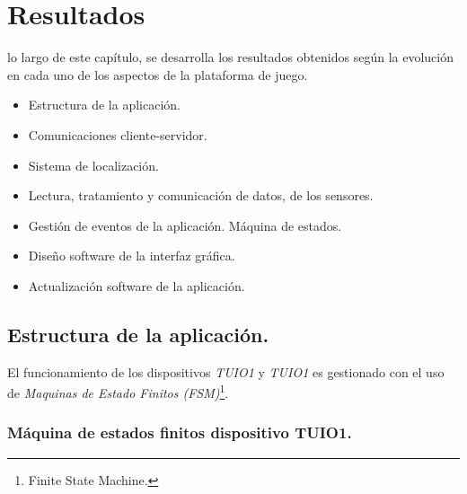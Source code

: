 \chapter{Resultados}
\label{chap:resultados}


 lo largo de este capítulo, se desarrolla los resultados obtenidos según la evolución en cada uno de los aspectos de la plataforma de juego.
\begin{itemize}
\item Estructura de la aplicación.
\item Comunicaciones cliente-servidor.
\item Sistema de localización.
\item Lectura, tratamiento y comunicación de datos, de los sensores.
\item Gestión de eventos de la aplicación. Máquina de estados.
\item Diseño software de la interfaz gráfica.
\item Actualización software de la aplicación.
\end{itemize}


\section{Estructura de la aplicación.}
El funcionamiento de los dispositivos \emph{TUIO1} y \emph{TUIO1} es gestionado con el uso de \emph{Maquinas de Estado Finitos (FSM)}\footnote{Finite State Machine.}.


\subsection{Máquina de estados finitos dispositivo TUIO1.}

